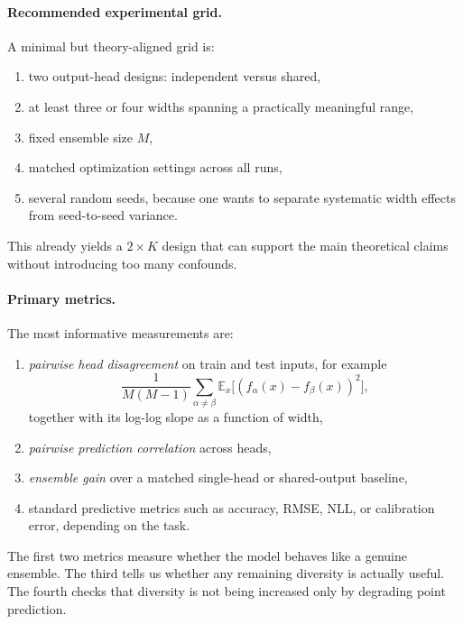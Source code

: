 \documentclass[11pt]{article}
\theoremstyle{definition}
\begin{document}
\paragraph{Recommended experimental grid.}
A minimal but theory-aligned grid is:
\begin{enumerate}[leftmargin=2em]
  \item two output-head designs: independent versus shared,
  \item at least three or four widths spanning a practically meaningful range,
  \item fixed ensemble size $M$,
  \item matched optimization settings across all runs,
  \item several random seeds, because one wants to separate systematic width effects from seed-to-seed variance.
\end{enumerate}
This already yields a $2\times K$ design that can support the main theoretical claims without introducing too many confounds.

\paragraph{Primary metrics.}
The most informative measurements are:
\begin{enumerate}[leftmargin=2em]
  \item \emph{pairwise head disagreement} on train and test inputs, for example
  \[
    \frac{1}{M(M-1)}
    \sum_{\alpha\neq\beta}
    \mathbb E_x\bigl[(f_\alpha(x)-f_\beta(x))^2\bigr],
  \]
  together with its log-log slope as a function of width,
  \item \emph{pairwise prediction correlation} across heads,
  \item \emph{ensemble gain} over a matched single-head or shared-output baseline,
  \item standard predictive metrics such as accuracy, RMSE, NLL, or calibration error, depending on the task.
\end{enumerate}
The first two metrics measure whether the model behaves like a genuine ensemble.
The third tells us whether any remaining diversity is actually useful.
The fourth checks that diversity is not being increased only by degrading point prediction.
\end{document}
